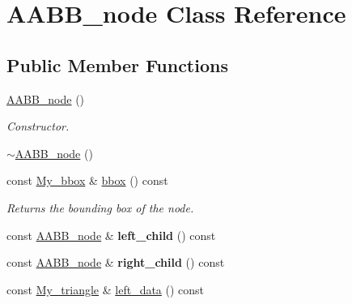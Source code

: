 \hypertarget{class_a_a_b_b__node}{}\section{A\+A\+B\+B\+\_\+node Class Reference}
\label{class_a_a_b_b__node}
\subsection*{Public Member Functions}
\begin{DoxyCompactItemize}
\item 
\hyperlink{class_a_a_b_b__node_ac531194a5eac2f7229562980b5b20980}{A\+A\+B\+B\+\_\+node} ()\hypertarget{class_a_a_b_b__node_ac531194a5eac2f7229562980b5b20980}{}\label{class_a_a_b_b__node_ac531194a5eac2f7229562980b5b20980}

\begin{DoxyCompactList}\small\item\em Constructor. \end{DoxyCompactList}\item 
\hyperlink{class_a_a_b_b__node_a2b053e3bd1ab4bd474dc59e7fdbfaa98}{$\sim$\+A\+A\+B\+B\+\_\+node} ()
\item 
const \hyperlink{struct_my__bbox}{My\+\_\+bbox} \& \hyperlink{class_a_a_b_b__node_a197ca0deb35408c6f8a9106a6a677a4d}{bbox} () const \hypertarget{class_a_a_b_b__node_a197ca0deb35408c6f8a9106a6a677a4d}{}\label{class_a_a_b_b__node_a197ca0deb35408c6f8a9106a6a677a4d}

\begin{DoxyCompactList}\small\item\em Returns the bounding box of the node. \end{DoxyCompactList}\item 
const \hyperlink{class_a_a_b_b__node}{A\+A\+B\+B\+\_\+node} \& {\bfseries left\+\_\+child} () const \hypertarget{class_a_a_b_b__node_a14b481fab95cbb2aee234e556f956df1}{}\label{class_a_a_b_b__node_a14b481fab95cbb2aee234e556f956df1}

\item 
const \hyperlink{class_a_a_b_b__node}{A\+A\+B\+B\+\_\+node} \& {\bfseries right\+\_\+child} () const \hypertarget{class_a_a_b_b__node_a68093fd4c41173505afff6431405862d}{}\label{class_a_a_b_b__node_a68093fd4c41173505afff6431405862d}

\item 
const \hyperlink{struct_my__triangle}{My\+\_\+triangle} \& \hyperlink{class_a_a_b_b__node_af16ee8283a69a567baa4b260cdea8cd1}{left\+\_\+data} () const \hypertarget{class_a_a_b_b__node_af16ee8283a69a567baa4b260cdea8cd1}{}\label{class_a_a_b_b__node_af16ee8283a69a567baa4b260cdea8cd1}


\end{DoxyCompactItemize}

